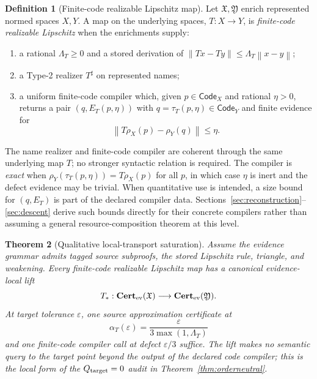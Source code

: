 \documentclass[11pt]{article}
\newtheorem{theorem}{Theorem}[section]
\theoremstyle{definition}
\newtheorem{definition}[theorem]{Definition}
\newcommand{\norm}[1]{\left\lVert #1 \right\rVert}
\newcommand{\Code}{\mathsf{Code}}
\newcommand{\Cert}{\mathbf{Cert}}
\begin{document}
\begin{definition}[Finite-code realizable Lipschitz map]\label{def:code-realizable}
Let $\mathfrak X,\mathfrak Y$ enrich represented normed spaces $X,Y$.  A map on the
underlying spaces, $T:X\to Y$, is \emph{finite-code realizable Lipschitz} when the
enrichments supply:
\begin{enumerate}[label=(\roman*)]
\item a rational $\Lambda_T\ge0$ and a stored derivation of
$\norm{Tx-Ty}\le\Lambda_T\norm{x-y}$;
\item a Type-2 realizer $T^\sharp$ on represented names;
\item a uniform finite-code compiler which, given $p\in\Code_X$ and rational $\eta>0$,
returns a pair $(q,E_T(p,\eta))$ with $q=\tau_T(p,\eta)\in\Code_Y$ and finite evidence
for
\[
 \norm{T\rho_X(p)-\rho_Y(q)}\le\eta.
\]
\end{enumerate}
The name realizer and finite-code compiler are coherent through the same underlying map
$T$; no stronger syntactic relation is required.  The compiler is \emph{exact} when
$\rho_Y(\tau_T(p,\eta))=T\rho_X(p)$ for all $p$, in which case $\eta$ is inert and
the defect evidence may be trivial.  When quantitative use is intended, a size bound for
$(q,E_T)$ is part of the declared compiler data.  Sections~\ref{sec:reconstruction}--\ref{sec:descent}
derive such bounds directly for their concrete compilers rather than assuming a general
resource-composition theorem at this level.
\end{definition}

\begin{theorem}[Qualitative local-transport saturation]\label{thm:saturation}
Assume the evidence grammar admits tagged source subproofs, the stored Lipschitz rule,
triangle, and weakening.  Every finite-code realizable Lipschitz map has a canonical
evidence-local lift
\[
 T_*:\Cert_{\rm ev}(\mathfrak X)\longrightarrow\Cert_{\rm ev}(\mathfrak Y).
\]
At target tolerance $\varepsilon$, one source approximation certificate at
\[
 \alpha_T(\varepsilon)=\frac{\varepsilon}{3\max(1,\Lambda_T)}
\]
and one finite-code compiler call at defect $\varepsilon/3$ suffice.  The lift makes no semantic query to the target point beyond the output of the declared
code compiler; this is the local form of the $Q_{\rm target}=0$ audit in
Theorem~\ref{thm:orderneutral}.
\end{theorem}
\end{document}
